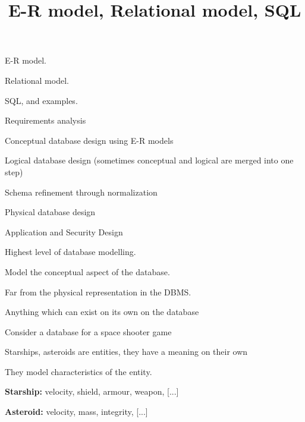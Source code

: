 \documentclass{beamer}
\title{E-R model, Relational model, SQL}
\author{ }
\institute{Hogeschool Rotterdam \\ 
Rotterdam, Netherlands}
\date{}
\begin{document}
\maketitle

\begin{slide}{
\item E-R model.
\item Relational model.
\item SQL, and examples.
}\end{slide}

\begin{slide}{
\item Requirements analysis 
\pause
\item Conceptual database design using E-R models
\pause
\item Logical database design (sometimes conceptual and logical are merged into one step) 
\pause
\item Schema refinement through normalization
\pause
\item Physical database design
\pause
\item Application and Security Design
}\end{slide}

\begin{slide}{
\item Highest level of database modelling.
\item Model the conceptual aspect of the database.
\item Far from the physical representation in the DBMS.
}\end{slide}

\begin{slide}{
\item Anything which can exist on its own on the database
\item Consider a database for a space shooter game
\item Starships, asteroids are entities, they have a meaning on their own

}\end{slide}

\begin{slide}{
\item They model characteristics of the entity.
\item \textbf{Starship:} velocity, shield, armour, weapon, [...]
\item \textbf{Asteroid:} velocity, mass, integrity, [...]

}\end{slide}
\end{document}
